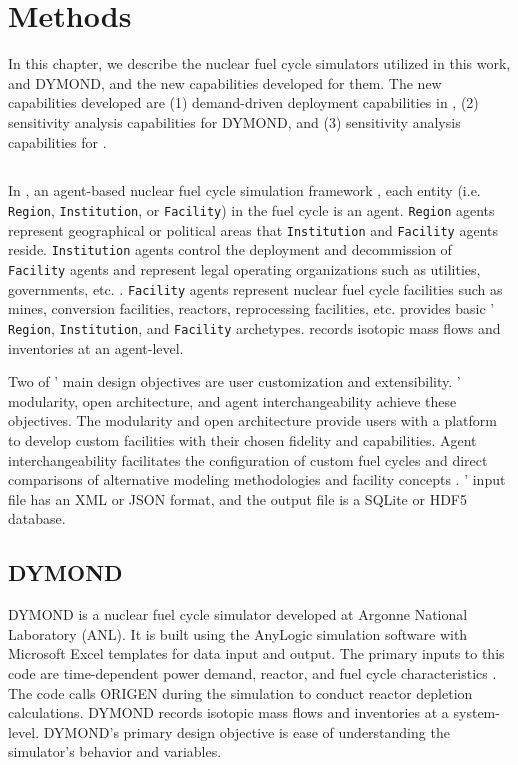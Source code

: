 \chapter{Methods}
\label{chap:3}
In this chapter, we describe the nuclear fuel cycle simulators utilized in this work, 
\Cyclus and DYMOND, and the new capabilities developed for them. 
The new capabilities developed are 
(1) demand-driven deployment capabilities in \Cyclus, 
(2) sensitivity analysis capabilities for DYMOND, and
(3) sensitivity analysis capabilities for \Cyclus. 

\section{\Cyclus}
In \Cyclus, an agent-based nuclear fuel cycle simulation framework 
\cite{huff_fundamental_2016}, 
each entity (i.e. \texttt{Region}, \texttt{Institution}, or \texttt{Facility}) in the 
fuel cycle is an agent. 
\texttt{Region} agents represent geographical or political areas 
that \texttt{Institution}
and \texttt{Facility} agents reside. 
\texttt{Institution} agents control the 
deployment and decommission of \texttt{Facility} agents 
and represent legal operating organizations such as
utilities, governments, etc. \cite{huff_fundamental_2016}.
\texttt{Facility} agents represent nuclear fuel cycle facilities
such as mines, conversion facilities, reactors, reprocessing facilities, 
etc. 
\Cycamore \cite{carlsen_cycamore_2014}
provides basic \Cyclus' \texttt{Region}, \texttt{Institution}, 
and \texttt{Facility} archetypes. 
\Cyclus records isotopic mass flows and inventories at an agent-level. 

Two of \Cyclus' main design objectives are user customization and 
extensibility. 
\Cyclus' modularity, open architecture, and agent interchangeability 
achieve these objectives.
The modularity and open architecture provide users with a 
platform to develop custom facilities with their chosen fidelity 
and capabilities. 
Agent interchangeability facilitates the configuration of custom fuel 
cycles and direct comparisons of alternative modeling methodologies 
and facility concepts \cite{huff_fundamental_2016}. 
\Cyclus' input file has an XML or JSON format, and the output file is 
a SQLite or HDF5 database. 

\section{DYMOND}
DYMOND \cite{yacout_modeling_2005} is a nuclear fuel cycle simulator developed 
at Argonne National Laboratory (\gls{ANL}). 
It is built using the AnyLogic simulation software with 
Microsoft Excel templates for data input and output. 
The primary inputs to this code are time-dependent power demand, 
reactor, and fuel cycle characteristics 
\cite{feng_standardized_2016}.   
The code calls ORIGEN \cite{bell_origen_1973} during the simulation 
to conduct reactor depletion calculations. 
DYMOND records isotopic mass flows and inventories
at a system-level.
DYMOND's primary design objective is ease of understanding the  
simulator's behavior and variables. 

